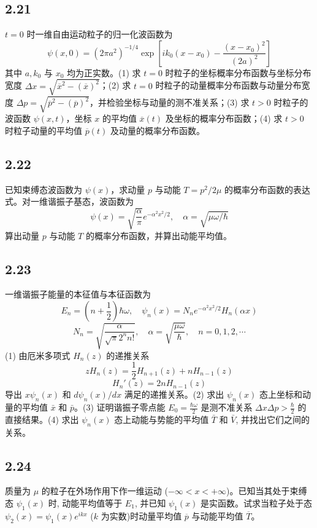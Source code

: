 \newpage
\subsection{2.21}
$t = 0$ 时一维自由运动粒子的归一化波函数为
$$\psi (x, 0) = (2\pi a^2)^{-1/4} \exp \left[ i k_0 (x - x_0) - \frac{(x - x_0)^2}{(2a)^2} \right]$$
其中 $a, k_0$ 与 $x_0$ 均为正实数。(1) 求 $t = 0$ 时粒子的坐标概率分布函数与坐标分布宽度 $\Delta x = \sqrt{\overline{x}^2 - (\overline{x})^2}$；(2) 求 $t = 0$ 时粒子的动量概率分布函数与动量分布宽度 $\Delta p = \sqrt{\overline{p}^2 - (\overline{p})^2}$，并检验坐标与动量的测不准关系；(3) 求 $t > 0$ 时粒子的波函数 $\psi (x, t)$，坐标 $x$ 的平均值 $\overline{x}(t)$ 及坐标的概率分布函数；(4) 求 $t > 0$ 时粒子动量的平均值 $\overline{p}(t)$ 及动量的概率分布函数。

\subsection{2.22}
已知束缚态波函数为 $\psi(x)$，求动量 $p$ 与动能 $T = p^2 / 2\mu$ 的概率分布函数的表达式。对一维谐振子基态，波函数为
$$\psi(x) = \sqrt{\frac{\alpha}{\pi}} e^{-\alpha^2 x^2 / 2}, \quad \alpha = \sqrt{\mu \omega / \hbar}$$
算出动量 $p$ 与动能 $T$ 的概率分布函数，并算出动能平均值。

\subsection{2.23}
一维谐振子能量的本征值与本征函数为
$$E_n = \left( n + \frac{1}{2} \right) \hbar \omega, \quad \psi_n(x) = N_n e^{-\alpha^2 x^2 / 2} H_n (\alpha x)$$
$$N_n = \sqrt{\frac{\alpha}{\sqrt{\pi} 2^n n!}}, \quad \alpha = \sqrt{\frac{\mu \omega}{\hbar}}, \quad n = 0, 1, 2, \cdots$$
(1) 由厄米多项式 $H_n(z)$ 的递推关系
$$zH_n(z) = \frac{1}{2} H_{n+1}(z) + nH_{n-1}(z)$$
$$H_n'(z) = 2nH_{n-1}(z)$$
导出 $x \psi_n(x)$ 和 $d \psi_n(x) / dx$ 满足的递推关系。(2) 求出 $\psi_n(x)$ 态上坐标和动量的平均值 $\bar{x}$ 和 $\bar{p}$。(3) 证明谐振子零点能 $E_0 = \frac{\hbar \omega}{2}$ 是测不准关系 $\Delta x \Delta p > \frac{\hbar}{2}$ 的直接结果。(4) 求出 $\psi_n(x)$ 态上动能与势能的平均值 $\bar{T}$ 和 $\bar{V}$, 并找出它们之间的关系。

\subsection{2.24}
质量为 $\mu$ 的粒子在外场作用下作一维运动 ($-\infty < x < +\infty$)。已知当其处于束缚态 $\psi_1(x)$ 时, 动能平均值等于 $E_1$, 并已知 $\psi_1(x)$ 是实函数。试求当粒子处于态 $\psi_2(x) = \psi_1(x) e^{ikx}$ ($k$ 为实数)时动量平均值 $\overline{p}$ 与动能平均值 $\overline{T}$。


